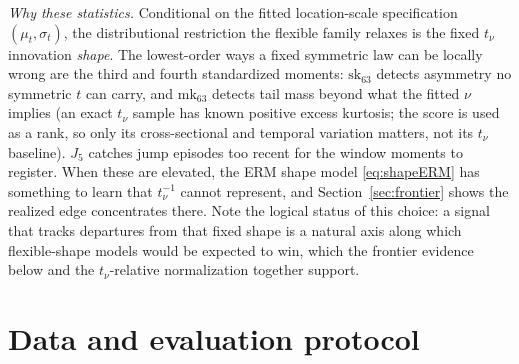\documentclass[11pt]{article}
\theoremstyle{remark}
\begin{document}
\emph{Why these statistics.} Conditional on the fitted location-scale
specification $(\mu_t,\sigma_t)$, the distributional restriction the
flexible family relaxes is the fixed $t_\nu$ innovation \emph{shape}.
The lowest-order ways a fixed symmetric law can be
locally wrong are the third and fourth standardized moments:
$\mathrm{sk}_{63}$ detects asymmetry no symmetric $t$ can carry, and
$\mathrm{mk}_{63}$ detects tail mass beyond what the fitted $\nu$
implies (an exact $t_\nu$ sample has known positive excess kurtosis;
the score is used as a rank, so only its cross-sectional and
temporal variation matters, not its $t_\nu$ baseline). $J_5$ catches
jump episodes too recent for the window moments to register. When these
are elevated, the ERM shape model \eqref{eq:shapeERM} has something to
learn that $t_\nu^{-1}$ cannot represent, and Section~\ref{sec:frontier} shows the realized edge concentrates there. Note the logical
status of this choice: a signal that tracks departures from that fixed
shape is a natural axis along which flexible-shape models would be
expected to win, which the frontier evidence below
and the $t_\nu$-relative normalization together support.

\medskip\noindent{}

\section{Data and evaluation protocol}\label{sec:protocol}
\end{document}
